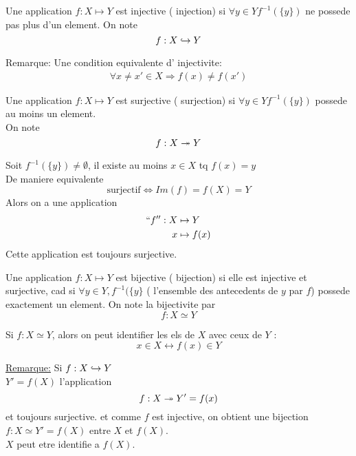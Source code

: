 \documentclass[../main.tex]{subfiles}
\begin{document}
\begin{defn}[Injectivite]\label{defn:injectivite}
	Une application $f:X \mapsto Y$ est injective ( injection) si $\forall y \in Y f^{-1} ( \{y\})$ ne possede pas plus d'un element. 
	On note
	\[ 
	f: X \hookrightarrow Y
	\]
	
\end{defn}
Remarque: Une condition equivalente d' injectivite:
\begin{align*}
	\forall x \neq x' \in X \Rightarrow f(x) \neq f(x')
\end{align*}
\begin{defn}[Surjectivite]\label{defn:surjectivite}
	Une application $f:X \mapsto Y$ est surjective ( surjection) si $\forall y \in Y  f^{-1} ( \{y\})$ possede au moins un element.\\
	On note
	\[ 
	f: X \twoheadrightarrow Y
	\]
		
\end{defn}

Soit $ f^{-1} ( \{y\}) \neq \emptyset$, il existe au moins $x \in X$ tq  $f(x)=y$\\
De maniere equivalente
\[ 
	\text{surjectif} \iff Im(f) = f(X) = Y	
\]
Alors on a une application
\begin{align*}
	``f'' : X &\mapsto Y\\
	x &\mapsto f(x)
\end{align*}
Cette application est toujours surjective.\\

\begin{defn}[Bijectivite]\label{defn:bijectivite}
	Une application $f:X \mapsto Y$ est bijective ( bijection) si elle est injective et surjective, cad si 
	$\forall y \in Y, f^{-1}(\{y\}$ ( l'ensemble des antecedents de $y$ par $f$) possede exactement un element.
	On note la bijectivite par
	\[ 
	f: X \simeq Y
	\]
\end{defn}

Si $f:X \simeq Y$, alors on peut identifier les els de  $X$ avec ceux de $Y$ :
\[ 
	x \in X \leftrightarrow f(x) \in Y
\]

\underline{Remarque:} Si $f: X \hookrightarrow Y$\\
$Y' = f(X)$ l'application
\[ 
	f: X \twoheadrightarrow Y' = f(x)
\]
et toujours surjective.
et comme $f$ est injective, on obtient une bijection $f: X \simeq Y'=f(X)$ entre $X$ et $f(X)$.\\
$X$ peut etre identifie a $f(X)$.
\end{document}
